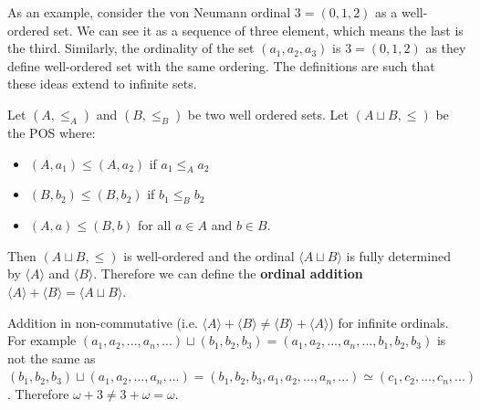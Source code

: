 \documentclass{article}
\newcommand{\marginleft}[1] {\reversemarginpar\marginpar{#1}}
\begin{document}
\begin{remark}
	As an example, consider the von Neumann ordinal $3 = (0, 1, 2)$ as a well-ordered set. We can see it as a sequence of three element, which means the last is the third. Similarly, the ordinality of the set $(a_1, a_2, a_3)$ is $3 = (0, 1, 2)$ as they define well-ordered set with the same ordering. The definitions are such that these ideas extend to infinite sets.
\end{remark}

\begin{defn}
	Let $(A, \leq_A)$ \marginleft{Ordinal addition: $\langle A \rangle + \langle B \rangle$} and $(B, \leq_B)$ be two well ordered sets. Let $(A \sqcup B, \leq)$ be the POS where:
	\begin{itemize}
		\item $(A, a_1) \leq (A, a_2)$ if $a_1 \leq_A a_2$
		\item $(B, b_2) \leq (B, b_2)$ if $b_1 \leq_B b_2$
		\item $(A, a) \leq (B, b)$ for all $a \in A$ and $b \in B$.  	
	\end{itemize}
	Then $(A \sqcup B, \leq)$ is well-ordered and the ordinal $\langle A \sqcup B \rangle$ is fully determined by $\langle A \rangle$ and $\langle B \rangle$. Therefore we can define the \textbf{ordinal addition} $\langle A \rangle + \langle B \rangle =  \langle A \sqcup B \rangle$.
\end{defn}


\begin{remark}
	Addition in non-commutative (i.e. $\langle A \rangle + \langle B \rangle \neq \langle B \rangle + \langle A \rangle$) for infinite ordinals. For example $(a_1, a_2, ..., a_n, ...) \sqcup (b_1, b_2, b_3) = (a_1, a_2, ..., a_n, ..., b_1, b_2, b_3)$ is not the same as $(b_1, b_2, b_3) \sqcup (a_1, a_2, ..., a_n, ...) = (b_1, b_2, b_3, a_1, a_2, ..., a_n, ...) \simeq (c_1, c_2, ..., c_n, ...)$. Therefore $\omega + 3 \neq 3 + \omega = \omega$.
\end{remark}
\end{document}

